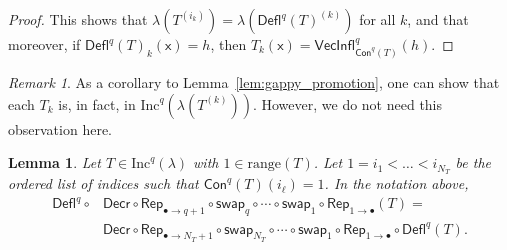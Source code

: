 \documentclass[12pt]{amsart}
\newcommand{\x}{\ensuremath{\mathsf{x}}}
\newtheorem{lemma}[theorem]{Lemma}
\theoremstyle{definition}
\theoremstyle{remark}
\newtheorem{remark}[theorem]{Remark}
\numberwithin{equation}{section}
\newcommand{\inc}{\ensuremath{\mathrm{Inc}}}
\newcommand{\swap}{\ensuremath{\mathsf{swap}}}
\newcommand{\decr}{\ensuremath{\mathsf{Decr}}}
\newcommand{\rep}{\ensuremath{\mathsf{Rep}}}
\newcommand{\deflate}{\ensuremath{\mathsf{Defl}}}
\newcommand{\inflate}{\ensuremath{\mathsf{VecInfl}}}
\newcommand{\content}{\ensuremath{\mathsf{Con}}}
\begin{document}
\begin{proof}
This shows that $\lambda \left(T^{(i_k)} \right) = \lambda \left(\deflate^q(T)^{(k)} \right)$ for all $k$, and that moreover, if $\deflate^q(T)_{k}(\x) = h$, then $T_k(\x) = \inflate^q_{\content^q(T)}(h)$. 
\end{proof}

\begin{remark}
As a corollary to Lemma~\ref{lem:gappy_promotion}, one can show that each $T_k$ is, in fact, in $\inc^q \left(\lambda \left( T^{(k)} \right) \right)$. However, we do not need this observation here.
\end{remark}

\begin{lemma}\label{lem:deflation_commutation}
Let $T \in \inc^q(\lambda)$ with $1 \in \mathrm{range}(T)$. Let $1 = i_1 < \dots < i_{N_T}$ be the ordered list of indices such that $\content^q(T)(i_\ell) = 1$. In the notation above, 
\begin{align*}
 \deflate^q \circ &\decr \circ \rep_{\bullet \rightarrow q+1} \circ \swap_q \circ \cdots \circ \swap_1\circ \rep_{1 \rightarrow \bullet} (T) = \\
 & \decr \circ \rep_{\bullet \rightarrow N_T+1} \circ \swap_{N_T} \circ \cdots \circ \swap_1 \circ \rep_{1 \rightarrow \bullet} \circ \deflate^q (T). 
\end{align*}
\end{lemma}
\end{document}
